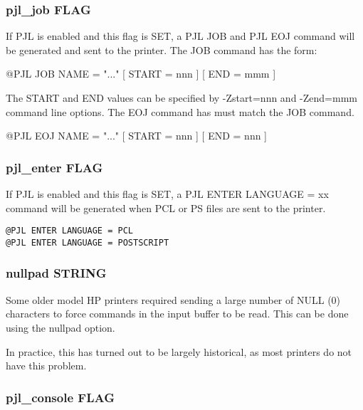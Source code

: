 \documentclass[a4paper]{article}
\begin{document}
\subsubsection{pjl\_job FLAG
\label{pjl_job}}

If PJL is enabled and this flag is SET,
a PJL JOB and PJL EOJ command will be generated
and sent to the printer.
The JOB command has the form:
\begin{tscreen}
@PJL JOB NAME = "..." {[} START = nnn {]} {[} END = mmm {]}
\end{tscreen}

The START and END values can be specified by
{\ttfamily -Zstart=nnn}
and
{\ttfamily -Zend=mmm}
command line options.
The EOJ command has must match the JOB command.
\begin{tscreen}
@PJL EOJ NAME = "..." {[} START = nnn {]} {[} END = nnn {]}
\end{tscreen}



\subsubsection{pjl\_enter FLAG
\label{pjl_enter}}

If PJL is enabled and this flag is SET,
a PJL ENTER LANGUAGE = xx command will be generated
when PCL or PS files are sent to the printer.
\begin{tscreen}
\begin{verbatim}
@PJL ENTER LANGUAGE = PCL
@PJL ENTER LANGUAGE = POSTSCRIPT
\end{verbatim}
\end{tscreen}



\subsubsection{nullpad STRING
\label{nullpad}}

Some older model HP printers required sending a large number of
NULL (0) characters to force commands in the input buffer to be read.
This can be done using the
{\ttfamily nullpad} option.

In practice,
this has turned out to be largely historical,
as most printers do not have this problem.


\subsubsection{pjl\_console FLAG
\label{pjl_console}}
\end{document}
